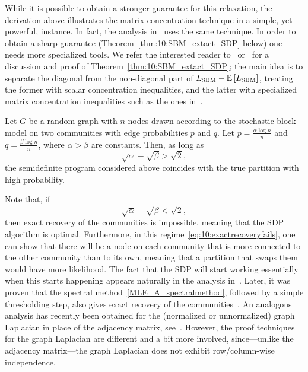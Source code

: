 While it is possible to obtain a stronger guarantee for this relaxation, the derivation above illustrates the matrix concentration technique in a simple, yet powerful, instance. In fact, the analysis in~\cite{Abbe_SBMExact} uses the same technique. 
 In order to obtain a sharp guarantee (Theorem~\ref{thm:10:SBM_extact_SDP} below) one needs more specialized tools. We refer the interested reader to~\cite{Bandeira_Laplacian} or~\cite{Hajek_et_al_SBM_SDP} for a discussion and proof of Theorem~\ref{thm:10:SBM_extact_SDP}; the main idea is to separate the diagonal from the non-diagonal part of $L_\text{SBM}  - \mathbb{E}\left[ L_\text{SBM} \right]$, treating the former with scalar concentration inequalities, and the latter with specialized matrix concentration inequalities such as the ones in~\cite{Bandeira_NARandomMatrixBound}.




\begin{theorem}\label{thm:10:SBM_extact_SDP}
Let $G$ be a random graph with $n$ nodes drawn according to the stochastic block model on two communities with edge probabilities $p$ and $q$. Let $p = \frac{\alpha \log n}n$ and $q = \frac{\beta \log n}n$, where $\alpha> \beta$ are constants. Then, as long as
\begin{equation}\label{eq:conditionsalphabetaSBMcor_2}
 \sqrt{\alpha} - \sqrt{\beta} > \sqrt{2},
\end{equation}
 the semidefinite program considered above coincides with the true partition with high probability. \end{theorem}

Note that, if 
\begin{equation}\label{eq:10:exactrecoveryfails}
 \sqrt{\alpha} - \sqrt{\beta} < \sqrt{2},
\end{equation}
then exact recovery of the communities is impossible, meaning that the SDP algorithm is optimal. Furthermore, in this regime~\eqref{eq:10:exactrecoveryfails}, one can show that there will be a node on each community that is more connected to the other community than to its own, meaning that a partition that swaps them would have more likelihood. The fact that the SDP will start working essentially when this starts happening appears naturally in the analysis in~\cite{Bandeira_Laplacian}. Later, it was proven that the spectral method~\eqref{MLE_A_spectralmethod}, followed by a simple thresholding step, also gives exact recovery of the communities~\cite{Abbe_et_al_spectralexact}. An analogous analysis has recently been obtained for the (normalized or unnormalized) graph Laplacian in place of the adjacency matrix, see~\cite{denglingstrohmer}. However, the proof techniques for the graph Laplacian are different and a bit more involved, since---unlike the adjacency matrix---the graph Laplacian does not  exhibit row/column-wise independence. 



